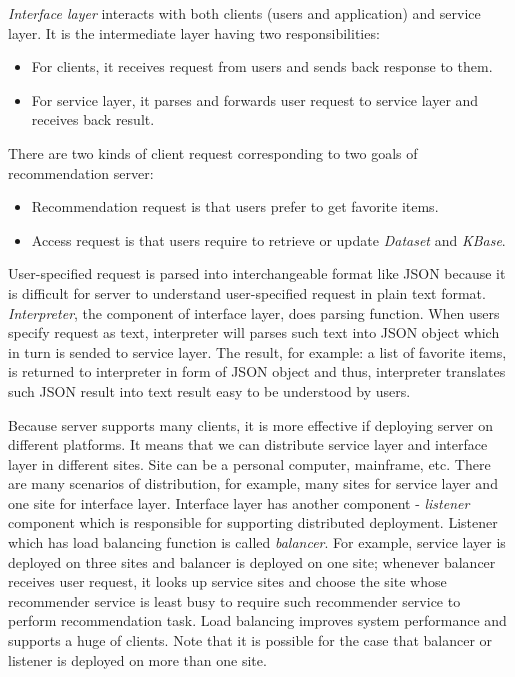 \documentclass[a4paper,twoside]{article}
\begin{document}
\textit{Interface layer} interacts with both clients (users and application) and service layer. It is the intermediate layer having two responsibilities:
\begin{itemize}
\item For clients, it receives request from users and sends back response to them.
\item For service layer, it parses and forwards user request to service layer and receives back result.
\end{itemize}
There are two kinds of client request corresponding to two goals of recommendation server:
\begin{itemize}
\item Recommendation request is that users prefer to get favorite items.
\item Access request is that users require to retrieve or update \textit{Dataset} and \textit{KBase}.
\end{itemize}
User-specified request is parsed into interchangeable format like JSON \cite{ecma2013} because it is difficult for server to understand user-specified request in plain text format. \textit{Interpreter}, the component of interface layer, does parsing function. When users specify request as text, interpreter will parses such text into JSON object which in turn is sended to service layer. The result, for example: a list of favorite items, is returned to interpreter in form of JSON object and thus, interpreter translates such JSON result into text result easy to be understood by users.

Because server supports many clients, it is more effective if deploying server on different platforms. It means that we can distribute service layer and interface layer in different sites. Site can be a personal computer, mainframe, etc. There are many scenarios of distribution, for example, many sites for service layer and one site for interface layer. Interface layer has another component - \textit{listener} component which is responsible for supporting distributed deployment. Listener which has load balancing function is called \textit{balancer}. For example, service layer is deployed on three sites and balancer is deployed on one site; whenever balancer receives user request, it looks up service sites and choose the site whose recommender service is least busy to require such recommender service to perform recommendation task. Load balancing improves system performance and supports a huge of clients. Note that it is possible for the case that balancer or listener is deployed on more than one site.
\end{document}
